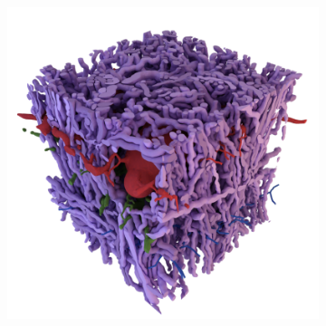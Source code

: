 \begin{figure}
  \centering
  \begin{subfigure}[]{0.49\textwidth}
    \includegraphics[width=\textwidth]{figures/config/render_cells}
  \end{subfigure}
  ~
  \begin{subfigure}[]{0.49\textwidth}

\end{subfigure}
\end{figure}
